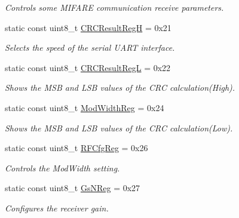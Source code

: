 \begin{DoxyCompactItemize}
\begin{DoxyCompactList}\small\item\em Controls some M\+I\+F\+A\+RE communication receive parameters. \end{DoxyCompactList}\item 
\mbox{\label{classMFRC522_ac1d563b996ba0cdf5f94dee272454b4c}} 
static const uint8\+\_\+t \hyperlink{classMFRC522_ac1d563b996ba0cdf5f94dee272454b4c}{C\+R\+C\+Result\+RegH} = 0x21
\begin{DoxyCompactList}\small\item\em Selects the speed of the serial U\+A\+RT interface. \end{DoxyCompactList}\item 
\mbox{\label{classMFRC522_aac4ba530ce3dc672d22e1840022c8dbf}} 
static const uint8\+\_\+t \hyperlink{classMFRC522_aac4ba530ce3dc672d22e1840022c8dbf}{C\+R\+C\+Result\+RegL} = 0x22
\begin{DoxyCompactList}\small\item\em Shows the M\+SB and L\+SB values of the C\+RC calculation(\+High). \end{DoxyCompactList}\item 
\mbox{\label{classMFRC522_a8f8491e3696a212253204e0a4d50b460}} 
static const uint8\+\_\+t \hyperlink{classMFRC522_a8f8491e3696a212253204e0a4d50b460}{Mod\+Width\+Reg} = 0x24
\begin{DoxyCompactList}\small\item\em Shows the M\+SB and L\+SB values of the C\+RC calculation(\+Low). \end{DoxyCompactList}\item 
\mbox{\label{classMFRC522_a6247cc38cc52524eb30d94a9e745811e}} 
static const uint8\+\_\+t \hyperlink{classMFRC522_a6247cc38cc52524eb30d94a9e745811e}{R\+F\+Cfg\+Reg} = 0x26
\begin{DoxyCompactList}\small\item\em Controls the Mod\+Width setting. \end{DoxyCompactList}\item 
\mbox{\label{classMFRC522_a91ddbaf4e4bc33dd43a7599238e9f9a1}} 
static const uint8\+\_\+t \hyperlink{classMFRC522_a91ddbaf4e4bc33dd43a7599238e9f9a1}{Gs\+N\+Reg} = 0x27
\begin{DoxyCompactList}\small\item\em Configures the receiver gain. \end{DoxyCompactList}\item 

\end{DoxyCompactItemize}
